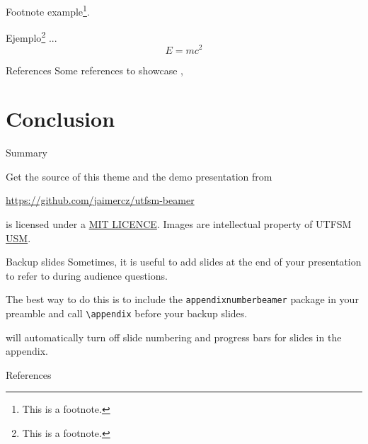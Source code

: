 %
\begin{frame}
    \frametitle{\insertsectionhead}
    \framesubtitle{\insertsubsectionhead}
	Footnote example\footnote{This is a footnote.}.
	\begin{example}
		Ejemplo\footnote{This is a footnote.} ...
		\begin{equation*}
			E =mc^2
		\end{equation*}
	\end{example}
\end{frame}


\begin{frame}{References}
  Some references to showcase 
  \citet{Knuth92},
  \citet{Simpson}
  \citet{greenwade93}
  \citet{ConcreteMath}
\end{frame}

\section{Conclusion}
\begin{frame}{Summary}

  Get the source of this theme and the demo presentation from

  \begin{center}\url{https://github.com/jaimercz/utfsm-beamer}\end{center}

  \themename is licensed under a
  \href{https://opensource.org/licenses/MIT}{MIT LICENCE}. Images are intellectual
  property of UTFSM \href{www.usm.cl}{USM}.

\end{frame}


\appendix

\begin{frame}[fragile]{Backup slides}
  Sometimes, it is useful to add slides at the end of your presentation to
  refer to during audience questions.

  The best way to do this is to include the \verb|appendixnumberbeamer|
  package in your preamble and call \verb|\appendix| before your backup slides.

  \themename will automatically turn off slide numbering and progress bars for
  slides in the appendix.
\end{frame}

\beamerdefaultoverlayspecification{<*>}
\begin{frame}[allowframebreaks]{References}

   

\end{frame}

